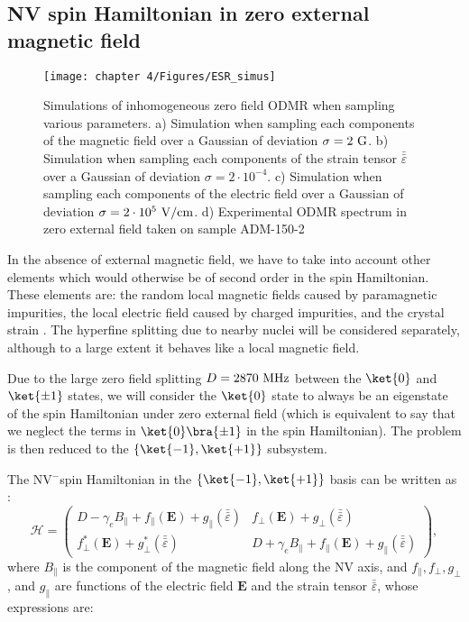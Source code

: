 \documentclass[a4paper,11pt]{report}
\begin{document}
\begin{refsection}
\subsection{NV spin Hamiltonian in zero external magnetic field}
\begin{figure}[h]
\centering
\texttt{[image: chapter 4/Figures/ESR\_simus]}
\caption{Simulations of inhomogeneous zero field ODMR when sampling various parameters. a) Simulation when sampling each components of the magnetic field over a Gaussian of deviation $\sigma=2\ \rm G$. b) Simulation when sampling each components of the strain tensor $\bar{\bar{\varepsilon}}$ over a Gaussian of deviation $\sigma=2\cdot 10^{-4}$. c) Simulation when sampling each components of the electric field over a Gaussian of deviation $\sigma=2\cdot 10^{5}\ \rm{V/cm}$. d) Experimental ODMR spectrum in zero external field taken on sample ADM-150-2}
\label{simus ESR}
\end{figure}

In the absence of external magnetic field, we have to take into account other elements which would otherwise be of second order in the spin Hamiltonian. These elements are: the random local magnetic fields caused by paramagnetic impurities, the local electric field caused by charged impurities, and the crystal strain \citep{doherty2012theory, udvarhelyi2018spin, mittiga2018imaging}. The hyperfine splitting due to nearby nuclei will be considered separately, although to a large extent it behaves like a local magnetic field.

Due to the large zero field splitting $D=2870\ \rm MHz$ between the $\ket{0}$ and $\ket{\pm 1}$ states, we will consider the $\ket{0}$ state to always be an eigenstate of the spin Hamiltonian under zero external field (which is equivalent to say that we neglect the terms in $\ket{0}\bra{\pm 1}$ in the spin Hamiltonian). The problem is then reduced to the $\{ \ket{-1}, \ket{+1} \}$ subsystem.

The NV$^-$spin Hamiltonian in the $\{ \ket{-1}, \ket{+1} \}$ basis can be written as \citep{udvarhelyi2018spin}:
\begin{equation}
\mathcal{H}=\begin{pmatrix}
D-\gamma_e B_\parallel + f_\parallel(\mathbf{E}) + g_\parallel(\bar{\bar{\varepsilon}}) & f_\perp(\mathbf{E}) + g_\perp(\bar{\bar{\varepsilon}})\\
f^*_\perp(\mathbf{E}) + g^*_\perp(\bar{\bar{\varepsilon}})&D+\gamma_e B_\parallel + f_\parallel(\mathbf{E}) + g_\parallel(\bar{\bar{\varepsilon}})
\end{pmatrix},
\label{Hamiltonien pm1}
\end{equation}
where $B_\parallel$ is the component of the magnetic field along the NV axis, and $f_\parallel, f_\perp, g_\perp$, and $g_\parallel$ are functions of the electric field $\mathbf{E}$ and the strain tensor $\bar{\bar{\varepsilon}}$, whose expressions are:


\end{refsection}
\end{document}
